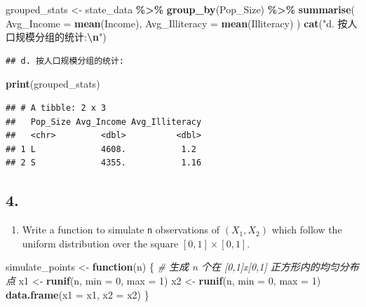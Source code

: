 \documentclass[
]{article}
\newenvironment{Shaded}{\begin{snugshade}}{\end{snugshade}}
\newcommand{\AttributeTok}[1]{\textcolor[rgb]{0.13,0.29,0.53}{#1}}
\newcommand{\CommentTok}[1]{\textcolor[rgb]{0.56,0.35,0.01}{\textit{#1}}}
\newcommand{\ControlFlowTok}[1]{\textcolor[rgb]{0.13,0.29,0.53}{\textbf{#1}}}
\newcommand{\DecValTok}[1]{\textcolor[rgb]{0.00,0.00,0.81}{#1}}
\newcommand{\FunctionTok}[1]{\textcolor[rgb]{0.13,0.29,0.53}{\textbf{#1}}}
\newcommand{\NormalTok}[1]{#1}
\newcommand{\OtherTok}[1]{\textcolor[rgb]{0.56,0.35,0.01}{#1}}
\newcommand{\SpecialCharTok}[1]{\textcolor[rgb]{0.81,0.36,0.00}{\textbf{#1}}}
\newcommand{\StringTok}[1]{\textcolor[rgb]{0.31,0.60,0.02}{#1}}
\providecommand{\tightlist}{%
  \setlength{\itemsep}{0pt}\setlength{\parskip}{0pt}}
\begin{document}
\begin{Shaded}
\begin{Highlighting}[]
\NormalTok{grouped\_stats }\OtherTok{\textless{}{-}}\NormalTok{ state\_data }\SpecialCharTok{\%\textgreater{}\%}
  \FunctionTok{group\_by}\NormalTok{(Pop\_Size) }\SpecialCharTok{\%\textgreater{}\%}
  \FunctionTok{summarise}\NormalTok{(}
    \AttributeTok{Avg\_Income =} \FunctionTok{mean}\NormalTok{(Income),}
    \AttributeTok{Avg\_Illiteracy =} \FunctionTok{mean}\NormalTok{(Illiteracy)}
\NormalTok{  )}
\FunctionTok{cat}\NormalTok{(}\StringTok{"d. 按人口规模分组的统计:}\SpecialCharTok{\textbackslash{}n}\StringTok{"}\NormalTok{)}
\end{Highlighting}
\end{Shaded}

\begin{verbatim}
## d. 按人口规模分组的统计:
\end{verbatim}

\begin{Shaded}
\begin{Highlighting}[]
\FunctionTok{print}\NormalTok{(grouped\_stats)}
\end{Highlighting}
\end{Shaded}

\begin{verbatim}
## # A tibble: 2 x 3
##   Pop_Size Avg_Income Avg_Illiteracy
##   <chr>         <dbl>          <dbl>
## 1 L             4608.           1.2 
## 2 S             4355.           1.16
\end{verbatim}

\subsection{4.}\label{section-3}

\begin{enumerate}
\def\labelenumi{\alph{enumi}.}
\tightlist
\item
  Write a function to simulate \texttt{n} observations of \((X_1, X_2)\)
  which follow the uniform distribution over the square
  \([0, 1] \times [0, 1]\).
\end{enumerate}

\begin{Shaded}
\begin{Highlighting}[]
\NormalTok{simulate\_points }\OtherTok{\textless{}{-}} \ControlFlowTok{function}\NormalTok{(n) \{}
  \CommentTok{\# 生成 n 个在 [0,1]x[0,1] 正方形内的均匀分布点}
\NormalTok{  x1 }\OtherTok{\textless{}{-}} \FunctionTok{runif}\NormalTok{(n, }\AttributeTok{min =} \DecValTok{0}\NormalTok{, }\AttributeTok{max =} \DecValTok{1}\NormalTok{)}
\NormalTok{  x2 }\OtherTok{\textless{}{-}} \FunctionTok{runif}\NormalTok{(n, }\AttributeTok{min =} \DecValTok{0}\NormalTok{, }\AttributeTok{max =} \DecValTok{1}\NormalTok{)}
  \FunctionTok{data.frame}\NormalTok{(}\AttributeTok{x1 =}\NormalTok{ x1, }\AttributeTok{x2 =}\NormalTok{ x2)}
\NormalTok{\}}
\end{Highlighting}
\end{Shaded}
\end{document}
